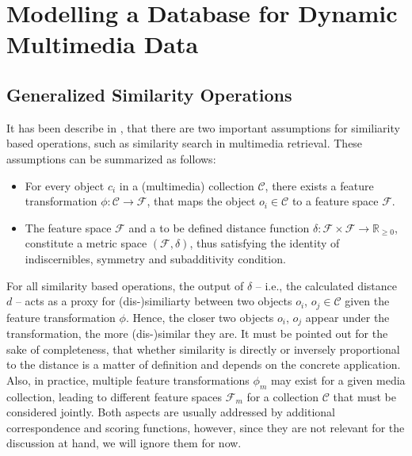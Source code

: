 \chapter{Modelling a Database for Dynamic Multimedia Data}
\label{chapter:system_model}


\section{Generalized Similarity Operations}

It has been describe in , that there are two important assumptions for similiarity based operations, such as similarity search in multimedia retrieval. These assumptions can be summarized as follows:

\begin{itemize}
    \item For every object $c_{i}$ in a (multimedia) collection $\mathcal{C}$, there exists a feature transformation $\phi \colon \mathcal{C} \to \mathcal{F}$, that maps the object $o_{i} \in \mathcal{C}$ to a feature space $\mathcal{F}$.
    \item The feature space $\mathcal{F}$ and a to be defined distance function $\delta \colon \mathcal{F} \times \mathcal{F} \to \mathbb{R}_{\geq 0}$, constitute a metric space $(\mathcal{F},\delta)$, thus satisfying the identity of indiscernibles, symmetry and subadditivity condition.
\end{itemize}

For all similarity based operations, the output of $\delta$ -- i.e., the calculated distance $d$ -- acts as a proxy for (dis-)similiarty between two objects $o_{i}$, $o_{j} \in \mathcal{C}$ given the feature transformation $\phi$. Hence, the closer two objects $o_{i}$, $o_{j}$ appear under the transformation, the more (dis-)similar they are. It must be pointed out for the sake of completeness, that whether similarity is directly or inversely proportional to the distance is a matter of definition and depends on the concrete application. Also, in practice, multiple feature transformations $\phi_m$ may exist for a given media collection, leading to different feature spaces $\mathcal{F}_m$ for a collection $\mathcal{C}$ that must be considered jointly. Both aspects are usually addressed by additional correspondence and scoring functions, however, since they are not relevant for the discussion at hand, we will ignore them for now.

